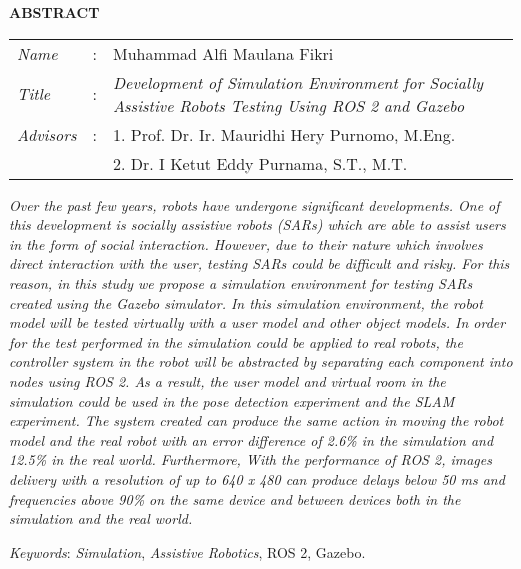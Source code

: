 \begin{center}
  \large\textbf{ABSTRACT}
\end{center}

\vspace{2ex}

\begingroup
  \setlength{\tabcolsep}{0pt}
  \noindent
  \begin{tabularx}{\textwidth}{l >{\centering}m{2em} X}
    \emph{Name}     &:& Muhammad Alfi Maulana Fikri \\
    \emph{Title}    &:&	\emph{Development of Simulation Environment for Socially Assistive Robots Testing Using ROS 2 and Gazebo} \\
    \emph{Advisors} &:& 1. Prof. Dr. Ir. Mauridhi Hery Purnomo, M.Eng. \\
                    & & 2. Dr. I Ketut Eddy Purnama, S.T., M.T. \\
  \end{tabularx}
\endgroup

\emph{
  Over the past few years,
    robots have undergone significant developments.
  One of this development is socially assistive robots (SARs) which are able to assist users in the form of social interaction.
  However,
    due to their nature which involves direct interaction with the user,
    testing SARs could be difficult and risky.
  For this reason,
    in this study we propose a simulation environment for testing SARs created using the Gazebo simulator.
  In this simulation environment,
    the robot model will be tested virtually with a user model and other object models.
  In order for the test performed in the simulation could be applied to real robots,
    the controller system in the robot will be abstracted by separating each component into nodes using ROS 2.
  As a result,
    the user model and virtual room in the simulation could be used in the pose detection experiment and the SLAM experiment.
  The system created can produce the same action in moving the robot model and the real robot with an error difference of 2.6\% in the simulation and 12.5\% in the real world.
  Furthermore, With the performance of ROS 2,
    images delivery with a resolution of up to 640 x 480 can produce delays below 50 ms and frequencies above 90\% on the same device and between devices both in the simulation and the real world.
}

\emph{Keywords}: \emph{Simulation}, \emph{Assistive Robotics}, ROS 2, Gazebo.
